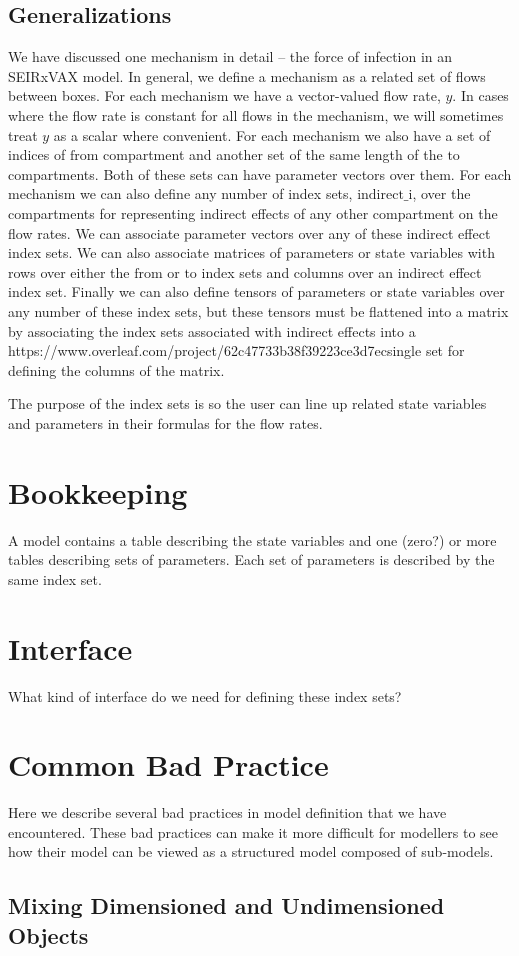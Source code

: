 \documentclass{article}
\theoremstyle{definition}
\begin{document}
\subsection{Generalizations}

We have discussed one mechanism in detail -- the force of infection in an SEIRxVAX model. In general, we define a mechanism as a related set of flows between boxes. For each mechanism we have a vector-valued flow rate, $y$. In cases where the flow rate is constant for all flows in the mechanism, we will sometimes treat $y$ as a scalar where convenient. For each mechanism we also have a set of indices of $\text{from}$ compartment and another set of the same length of the $\text{to}$ compartments. Both of these sets can have parameter vectors over them. For each mechanism we can also define any number of index sets, $\text{indirect\_i}$, over the compartments for representing indirect effects of any other compartment on the flow rates. We can associate parameter vectors over any of these indirect effect index sets. We can also associate matrices of parameters or state variables with rows over either the $\text{from}$ or $\text{to}$ index sets and columns over an indirect effect index set. Finally we can also define tensors of parameters or state variables over any number of these index sets, but these tensors must be flattened into a matrix by associating the index sets associated with indirect effects into a https://www.overleaf.com/project/62c47733b38f39223ce3d7ecsingle set for defining the columns of the matrix.

The purpose of the index sets is so the user can line up related state variables and parameters in their formulas for the flow rates.

\section{Bookkeeping}

A model contains a table describing the state variables and one (zero?) or more tables describing sets of parameters. Each set of parameters is described by the same index set.

\section{Interface}

What kind of interface do we need for defining these index sets?

\section{Common Bad Practice}

Here we describe several bad practices in model definition that we have encountered. These bad practices can make it more difficult for modellers to see how their model can be viewed as a structured model composed of sub-models.

\subsection{Mixing Dimensioned and Undimensioned Objects}
\end{document}
